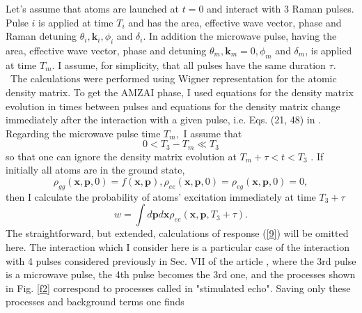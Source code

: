 \documentclass[twocolumn,showpacs,preprintnumbers]{revtex4}
\begin{document}
Let's assume that atoms are launched at $t=0$ and interact with 3 Raman
pulses. Pulse $i$ is applied at time $T_{i}$ and has the area, effective
wave vector, phase and Raman detuning $\theta _{i},\mathbf{k}_{i},\phi _{i}$
and $\delta _{i}$. In addition the microwave pulse, having the area,
effective wave vector, phase and detuning $\theta _{m},\mathbf{k}_{m}=0,\phi
_{m}$ and $\delta _{m}$, is applied at time $T_{m}.$ I assume, for
simplicity, that all pulses have the same duration $\tau .${\Huge \ }The
calculations were performed using Wigner representation for the atomic
density matrix. To get the AMZAI phase, I used equations for the density
matrix evolution in times between pulses and equations for the density
matrix change immediately after the interaction with a given pulse, i.e.
Eqs. (21, 48) in \cite{c8}. Regarding the microwave pulse time $T_{m},$ I
assume that 
\begin{equation}
0<T_{3}-T_{m}\ll T_{3}  \label{7}
\end{equation}%
so that one can ignore the density matrix evolution at $T_{m}+\tau <t<T_{3}$%
. If initially all atoms are in the ground state,%
\begin{equation}
\rho _{gg}\left( \mathbf{x},\mathbf{p},0\right) =f\left( \mathbf{x},\mathbf{p%
}\right) ,\rho _{ee}\left( \mathbf{x},\mathbf{p},0\right) =\rho _{eg}\left( 
\mathbf{x},\mathbf{p},0\right) =0,  \label{8}
\end{equation}%
then I calculate the probability of atoms' excitation immediately at time $%
T_{3}+\tau $%
\begin{equation}
w=\int d\mathbf{p}d\mathbf{x}\rho _{ee}\left( \mathbf{x},\mathbf{p}%
,T_{3}+\tau \right) .  \label{9}
\end{equation}%
The straightforward, but extended, calculations of response (\ref{9}) will
be omitted here. The interaction which I consider here is a particular case
of the interaction with 4 pulses considered previously in Sec. VII of the
article \cite{c8}, where the 3rd pulse is a microwave pulse, the 4th pulse
becomes the 3rd one, and the processes shown in Fig. \ref{f2} correspond to
processes called in \cite{c8} "stimulated echo". Saving only these processes
and background terms one finds%
\onecolumngrid
\end{document}
